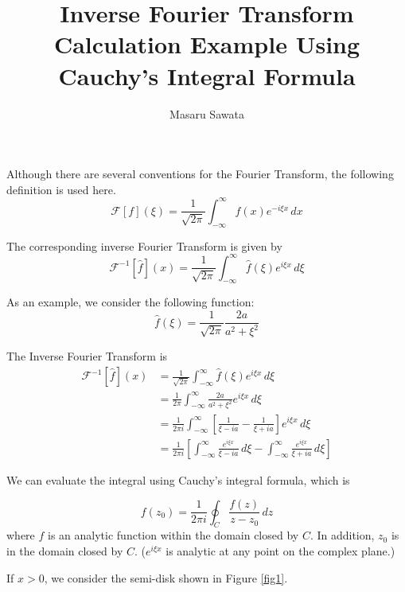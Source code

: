 \documentclass[letterpaper, 12pt]{article}
\title{Inverse Fourier Transform Calculation Example Using Cauchy's Integral Formula}
\author{Masaru Sawata}
\theoremstyle{custom}
\begin{document}
\maketitle
Although there are several conventions for the Fourier Transform, the following definition is used here.
\begin{equation*}
  \mathcal{F}\left[ f \right] \left( \xi \right) = \frac{1}{\sqrt{2 \pi}} \int_{-\infty}^{\infty} f(x) e^{-i\xi x} \, dx
\end{equation*}

The corresponding inverse Fourier Transform is given by
\begin{equation*}
  \mathcal{F}^{-1}  \left[ \hat{f} \right] \left( x \right) = \frac{1}{\sqrt{2 \pi}} \int_{-\infty}^{\infty} \hat{f}(\xi) e^{i\xi x} \, d\xi
\end{equation*}

As an example, we consider the following function:
\begin{equation*}
  \hat{f}(\xi)  = \frac{1}{\sqrt{2 \pi}} \frac{2a}{a^2+\xi^2}
\end{equation*}

The Inverse Fourier Transform is
\begin{align*}
  \mathcal{F}^{-1}  \left[ \hat{f} \right] \left( x \right) 
  &= \frac{1}{\sqrt{2 \pi}} \int_{-\infty}^{\infty} \hat{f}(\xi) e^{i\xi x} \, d\xi \\
  &= \frac{1}{2 \pi} \int_{-\infty}^{\infty} \frac{2a}{a^2+\xi^2} e^{i\xi x} \, d\xi \\
  &= \frac{1}{2 \pi i} \int_{-\infty}^{\infty} \left[  \frac{1}{\xi-ia} - \frac{1}{\xi+ia}  \right]e^{i\xi x}\, d\xi \\
  &= \frac{1}{2 \pi i} \left[ \int_{-\infty}^{\infty} \frac{e^{i\xi x}}{\xi-ia} \, d\xi -  \int_{-\infty}^{\infty} \frac{e^{i\xi x}}{\xi+ia} \, d\xi \right]
\end{align*}

We can evaluate the integral using Cauchy's integral formula, which is

\begin{equation*}
  f(z_0) = \frac{1}{2 \pi i} \oint_C \frac{f(z)}{z-z_0} \, dz
\end{equation*}
where $f$ is an analytic function within the domain closed by $C$. In addition, $z_0$ is in the domain closed by $C$.
($e^{i\xi x}$ is analytic at any point on the complex plane.)

If $x>0$, we consider the semi-disk shown in Figure \ref{fig1}.
\end{document}
